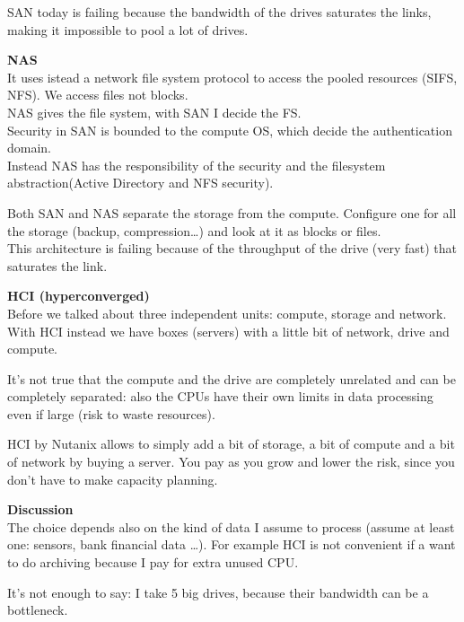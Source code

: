 SAN today is failing because the bandwidth of the drives saturates the
links, making it impossible to pool a lot of drives.

\textbf{NAS}\\
It uses istead a network file system protocol to access the pooled
resources (SIFS, NFS). We access files not blocks.\\
NAS gives the file system, with SAN I decide the FS.\\
Security in SAN is bounded to the compute OS, which decide the
authentication domain.\\
Instead NAS has the responsibility of the security and the filesystem
abstraction(Active Directory and NFS security).

Both SAN and NAS separate the storage from the compute. Configure one
for all the storage (backup, compression\ldots) and look at it as blocks
or files.\\
This architecture is failing because of the throughput of the drive
(very fast) that saturates the link.

\textbf{HCI (hyperconverged)}\\
Before we talked about three independent units: compute, storage and
network. With HCI instead we have boxes (servers) with a little bit of
network, drive and compute.

It's not true that the compute and the drive are completely unrelated
and can be completely separated: also the CPUs have their own limits in
data processing even if large (risk to waste resources).

HCI by Nutanix allows to simply add a bit of storage, a bit of compute
and a bit of network by buying a server. You pay as you grow and lower
the risk, since you don't have to make capacity planning.

\textbf{Discussion}\\
The choice depends also on the kind of data I assume to process (assume
at least one: sensors, bank financial data \ldots). For example HCI is
not convenient if a want to do archiving because I pay for extra unused
CPU.

It's not enough to say: I take 5 big drives, because their bandwidth can
be a bottleneck.

